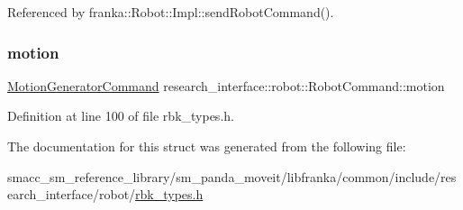 Referenced by franka\+::\+Robot\+::\+Impl\+::send\+Robot\+Command().

\mbox{\label{structresearch__interface_1_1robot_1_1RobotCommand_a34f8cf05244b624338e6bb56f379d863}} 
\subsubsection{\texorpdfstring{motion}{motion}}
{\footnotesize\ttfamily \hyperlink{structresearch__interface_1_1robot_1_1MotionGeneratorCommand}{Motion\+Generator\+Command} research\+\_\+interface\+::robot\+::\+Robot\+Command\+::motion}



Definition at line 100 of file rbk\+\_\+types.\+h.



The documentation for this struct was generated from the following file\+:\begin{DoxyCompactItemize}
\item 
smacc\+\_\+sm\+\_\+reference\+\_\+library/sm\+\_\+panda\+\_\+moveit/libfranka/common/include/research\+\_\+interface/robot/\hyperlink{rbk__types_8h}{rbk\+\_\+types.\+h}\end{DoxyCompactItemize}
